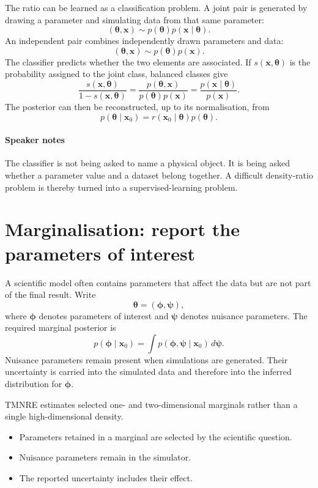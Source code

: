 ﻿\documentclass[13pt,a4paper]{article}
\begin{document}
The ratio can be learned as a classification problem. A joint pair is generated by drawing a parameter and simulating data from that same parameter:
\[
(\bm{\theta},\bm{x})\sim p(\bm{\theta})p(\bm{x}\mid\bm{\theta}).
\]
An independent pair combines independently drawn parameters and data:
\[
(\bm{\theta},\bm{x})\sim p(\bm{\theta})p(\bm{x}).
\]
The classifier predicts whether the two elements are associated. If $s(\bm{x},\bm{\theta})$ is the probability assigned to the joint class, balanced classes give
\begin{equation}
\frac{s(\bm{x},\bm{\theta})}{1-s(\bm{x},\bm{\theta})}
=
\frac{p(\bm{\theta},\bm{x})}{p(\bm{\theta})p(\bm{x})}
=
\frac{p(\bm{x}\mid\bm{\theta})}{p(\bm{x})}.
\end{equation}
The posterior can then be reconstructed, up to its normalisation, from
\[
p(\bm{\theta}\mid\bm{x}_0)
=r(\bm{x}_0\mid\bm{\theta})p(\bm{\theta}).
\]

\paragraph{Speaker notes}

The classifier is not being asked to name a physical object. It is being asked whether a parameter value and a dataset belong together. A difficult density-ratio problem is thereby turned into a supervised-learning problem.

\section*{Marginalisation: report the parameters of interest}

A scientific model often contains parameters that affect the data but are not part of the final result. Write
\[
\bm{\theta}=(\bm{\phi},\bm{\psi}),
\]
where $\bm{\phi}$ denotes parameters of interest and $\bm{\psi}$ denotes nuisance parameters. The required marginal posterior is
\begin{equation}
p(\bm{\phi}\mid\bm{x}_0)=
\int p(\bm{\phi},\bm{\psi}\mid\bm{x}_0)\,d\bm{\psi}.
\end{equation}
Nuisance parameters remain present when simulations are generated. Their uncertainty is carried into the simulated data and therefore into the inferred distribution for $\bm{\phi}$.

TMNRE estimates selected one- and two-dimensional marginals rather than a single high-dimensional density.
\begin{itemize}
\item Parameters retained in a marginal are selected by the scientific question.
\item Nuisance parameters remain in the simulator.
\item The reported uncertainty includes their effect.
\end{itemize}
\end{document}
